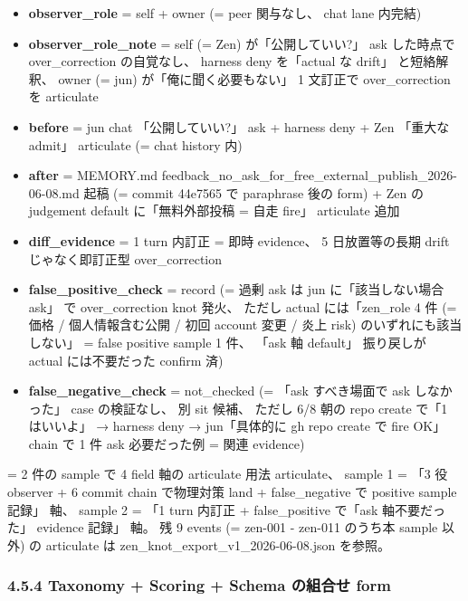 \documentclass[
]{article}
\providecommand{\tightlist}{%
  \setlength{\itemsep}{0pt}\setlength{\parskip}{0pt}}
\begin{document}
\begin{itemize}
\tightlist
\item
  \textbf{observer\_role} = self + owner (= peer 関与なし、 chat lane
  内完結)
\item
  \textbf{observer\_role\_note} = self (= Zen) が「公開していい?」 ask
  した時点で over\_correction の自覚なし、 harness deny を「actual な
  drift」 と短絡解釈、 owner (= jun) が「俺に聞く必要もない」 1 文訂正で
  over\_correction を articulate
\item
  \textbf{before} = jun chat 「公開していい?」 ask + harness deny + Zen
  「重大な admit」 articulate (= chat history 内)
\item
  \textbf{after} = MEMORY.md
  feedback\_no\_ask\_for\_free\_external\_publish\_2026-06-08.md 起稿 (=
  commit 44e7565 で paraphrase 後の form) + Zen の judgement default
  に「無料外部投稿 = 自走 fire」 articulate 追加
\item
  \textbf{diff\_evidence} = 1 turn 内訂正 = 即時 evidence、 5
  日放置等の長期 drift じゃなく即訂正型 over\_correction
\item
  \textbf{false\_positive\_check} = record (= 過剰 ask は jun
  に「該当しない場合 ask」 で over\_correction knot 発火、 ただし actual
  には「zen\_role 4 件 (= 価格 / 個人情報含む公開 / 初回 account 変更 /
  炎上 risk) のいずれにも該当しない」 = false positive sample 1 件、
  「ask 軸 default」 振り戻しが actual には不要だった confirm 済)
\item
  \textbf{false\_negative\_check} = not\_checked (= 「ask すべき場面で
  ask しなかった」 case の検証なし、 別 sit 候補、 ただし 6/8 朝の repo
  create で「1 はいいよ」 → harness deny → jun「具体的に gh repo create
  で fire OK」 chain で 1 件 ask 必要だった例 = 関連 evidence)
\end{itemize}

= 2 件の sample で 4 field 軸の articulate 用法 articulate、 sample 1 =
「3 役 observer + 6 commit chain で物理対策 land + false\_negative で
positive sample 記録」 軸、 sample 2 = 「1 turn 内訂正 + false\_positive
で「ask 軸不要だった」 evidence 記録」 軸。 残 9 events (= zen-001 -
zen-011 のうち本 sample 以外) の articulate は
zen\_knot\_export\_v1\_2026-06-08.json を参照。

\subsubsection{4.5.4 Taxonomy + Scoring + Schema の組合せ
form}\label{taxonomy-scoring-schema-ux306eux7d44ux5408ux305b-form}
\end{document}
